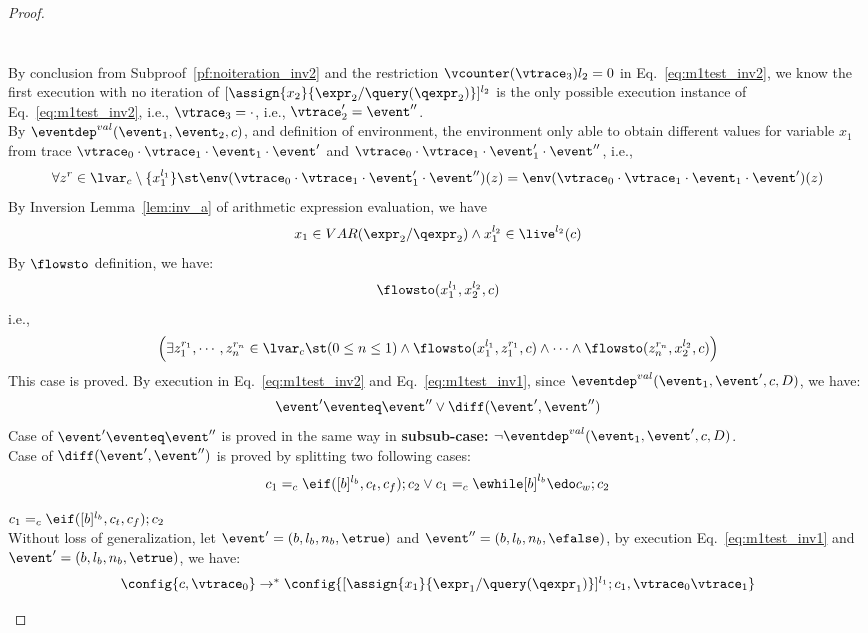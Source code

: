{\begin{proof}
\begin{case}[$\trace_2 = \trace_{ih} \cdot \event_{ih}$]
\[\begin{array}{l}
 \end{array} 
\]
%
\\
By conclusion from Subproof~\ref{pf:noiteration_inv2} and the restriction $\vcounter(\vtrace_3) l_2 = 0$ in Eq.~\ref{eq:m1test_inv2}, 
we know
the first execution with no iteration of $[\assign{{x}_2}{\expr_2 / \query(\qexpr_2)}]^{l_2}$ 
is the only possible execution instance of Eq.~\ref{eq:m1test_inv2}, i.e., $\vtrace_3 = \cdot$, i.e., $\vtrace_2' = \event''$.
\\
By $\eventdep^{val}(\event_1, \event_2, c)$, and definition of environment, 
the environment only able to obtain different values for variable $x_1$ 
from trace $\vtrace_0 \cdot \vtrace_1 \cdot \event_1 \cdot \event'$ and 
$\vtrace_0 \cdot \vtrace_1 \cdot \event_1' \cdot \event''$, i.e.,
\[
  \forall z^r \in \lvar_c \setminus \{x_1^{l_1}\} \st
  \env(\vtrace_0 \cdot \vtrace_1 \cdot \event_1' \cdot \event'') (z) =  
  \env(\vtrace_0 \cdot \vtrace_1 \cdot \event_1 \cdot \event') (z)
\]
By {Inversion Lemma~\ref{lem:inv_a}} of arithmetic expression evaluation, we have 
\[
  x_1 \in VAR(\expr_2 / \qexpr_2) \land x_1^{l_2} \in \live^{l_2}(c)
\]
%
By $\flowsto$ definition, we have:
%
\[
\flowsto(x_1^{l_1}, {x}_2^{l_2}, c)
\]
i.e.,
%
\[
\Big(\exists z_1^{r_1}, \cdots, z_n^{r_n} \in \lvar_{{c}} \st (0 \leq n \leq 1 )
 \land \flowsto(x_1^{l_1}, z_1^{r_1}, c) \land \cdots \land \flowsto(z_n^{r_n}, {x}_2^{l_2}, c) \Big)
\]
%
This case is proved.
%
%
By execution in Eq.~\ref{eq:m1test_inv2} and Eq.~\ref{eq:m1test_inv1}, since $\eventdep^{val}(\event_1, \event', c, D)$, we have:
\[
  \event' \eventeq \event'' \lor \diff(\event', \event'')
\]
%
Case of $\event' \eventeq \event''$ is proved in the same way in \textbf{subsub-case:} $\neg \eventdep^{val}(\event_1, \event', c, D)$.
\\
Case of $\diff(\event', \event'')$ is proved by splitting two following cases:
\[
  c_1 =_c \eif ([b]^{l_b}, c_t, c_f);{c}_2
  \lor
  c_1 =_c \ewhile [b]^{l_b} \edo c_w;{c}_2
\]
\begin{subproof} 
%
$c_1 =_c \eif ([b]^{l_b}, c_t, c_f);{c}_2$ 
\\
Without loss of generalization, 
let $\event' = (b, l_b, n_b, \etrue)$ and
$\event'' = (b, l_b, n_b, \efalse)$,
by execution Eq.~\ref{eq:m1test_inv1} and $\event' = (b, l_b, n_b, \etrue)$, we have:
\[
  \begin{array}{l}   
  \config{{c}, \vtrace_0} \rightarrow^{*} 
  \config{[\assign{{x}_1}{\expr_1 / \query(\qexpr_1)}]^{l_1} ; {c}_1, \vtrace_0 \vtrace_1}  

\end{array}\]
\end{subproof}
\end{case}
\end{proof}}
